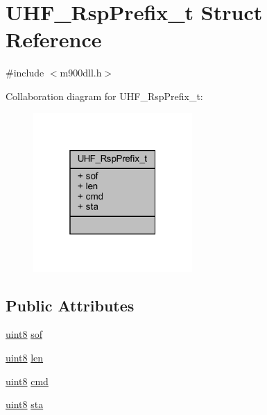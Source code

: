 \hypertarget{struct_u_h_f___rsp_prefix__t}{}\section{U\+H\+F\+\_\+\+Rsp\+Prefix\+\_\+t Struct Reference}
\label{struct_u_h_f___rsp_prefix__t}


{\ttfamily \#include $<$m900dll.\+h$>$}



Collaboration diagram for U\+H\+F\+\_\+\+Rsp\+Prefix\+\_\+t\+:
\nopagebreak
\begin{figure}[H]
\begin{center}
\leavevmode
\includegraphics[width=172pt]{struct_u_h_f___rsp_prefix__t__coll__graph}
\end{center}
\end{figure}
\subsection*{Public Attributes}
\begin{DoxyCompactItemize}
\item 
\mbox{\hyperlink{m900dll_8h_adde6aaee8457bee49c2a92621fe22b79}{uint8}} \mbox{\hyperlink{struct_u_h_f___rsp_prefix__t_a5cb5be4ce05892476e8a719bb63e0525}{sof}}
\item 
\mbox{\hyperlink{m900dll_8h_adde6aaee8457bee49c2a92621fe22b79}{uint8}} \mbox{\hyperlink{struct_u_h_f___rsp_prefix__t_a6069d1b7c33f96ddeaa9a8a2de64882c}{len}}
\item 
\mbox{\hyperlink{m900dll_8h_adde6aaee8457bee49c2a92621fe22b79}{uint8}} \mbox{\hyperlink{struct_u_h_f___rsp_prefix__t_a459cc328e398139920aa5bcd2116c3ad}{cmd}}
\item 
\mbox{\hyperlink{m900dll_8h_adde6aaee8457bee49c2a92621fe22b79}{uint8}} \mbox{\hyperlink{struct_u_h_f___rsp_prefix__t_a47a88a572f502bcdeeaa25899b55d8d6}{sta}}
\end{DoxyCompactItemize}


